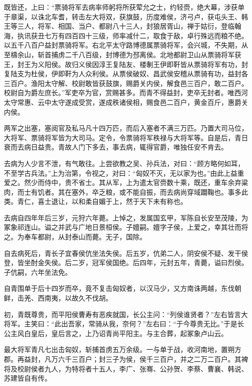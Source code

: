 \documentclass[12pt,UTF8]{ctexbook}
\begin{document}
既皆还，上曰：“票骑将军去病率师躬将所获荤允之士，约轻赍，绝大幕，涉获单于章渠，以诛北车耆，转击左大将双，获旗鼓，历度难侯，济弓卢，获屯头王、韩王等三人，将军、相国、当户、都尉八十三人，封狼居胥山，禅于姑衍，登临翰海，执讯获丑七万有四百四十三级，师率减什二，取食于敌，卓行殊远而粮不绝。以五千八百户益封票骑将军。右北平太守路博德属票骑将军，会兴城，不失期，从至檮余山，斩首捕虏二千八百级，封博德为邳离侯。北地都尉卫山从票骑将军获王，封王为义阳侯。故归义侯因淳王复陆友、楼剸王伊即靬皆从票骑将军有功，封复陆支为杜侯，伊即靬为人众利侯。从票侯破奴、昌武侯安稽从票骑有功，益封各三百户。渔阳太守解、校尉敢皆获鼓旗，赐爵关内侯，解食邑三百户，敢二百户。校尉自为爵左庶长。”军吏卒为官，赏赐甚多。而青不得益封，吏卒无封者。唯西河太守常惠、云中太守遂成受赏，遂成秩诸侯相，赐食邑二百户，黄金百斤，惠爵关内侯。



两军之出塞，塞阅官及私马凡十四万匹，而后入塞者不满三万匹。乃置大司马位，大将军、票骑将军皆为大司马。定令，令票骑将军秩禄与大将军等。自是后，青日衰而去病日益贵。青故人门下多去，事去病，辄得官爵，唯独任安不肯去。



去病为人少言不泄，有气敢往。上尝欲教之吴、孙兵法，对曰：“顾方略何如耳，不至学古兵法。”上为治第，令视之，对曰：“匈奴不灭，无以家为也。”由此上益重爱之。然少而侍中，贵不省士。其从军，上为遣太官赍数十乘，既还，重车余弃粱肉，而士有饥者。其在塞外，卒乏粮，或不能自振，而去病尚穿域躢鞠也。事多此类。青仁，喜士退让，以和柔自媚于上，然于天下未有称也。



去病自四年年后三岁，元狩六年薨。上悼之，发属国玄甲，军陈自长安至茂陵，为冢象祁连山。谥之并武与广地日景桓侯。子嬗嗣。嬗字子侯，上爱之，幸其壮而将之。为奉车都尉，从封泰山而薨。无子，国除。



自去病死后，青长子宜春侯伉坐法失侯。后五岁，伉弟二人，阴安侯不疑、发干侯登，皆坐酎金失侯。后二岁，冠军侯国绝。后四年，元封五年，青薨，谥曰烈侯。子伉嗣，六年坐法免。



自青围单于后十四岁而卒，竟不复击匈奴者，以汉马少，又方南诛两越，东伐朝鲜，击羌、西南夷，以故久不伐胡。



初，青既尊贵，而平阳侯曹寿有恶疾就国，长公主问：“列侯谁贤者？”左右皆言大将军。主笑曰：“此出吾家，常骑从我，奈何？”左右曰：“于今尊贵无比。”于是长公主风白皇后，皇后言之，上乃诏青尚平阳主。与主合葬，起冢象卢山云。



最大将军青凡七出击匈奴，斩捕首虏五万余级。一与单于战，收河南地，置朔方郡。再益封，凡万六千三百户；封三子为侯，侯千三百户，并之二万二百户。其裨将及校尉侯者九人，为特将者十五人，李广、张骞、公孙贺、李蔡、曹襄、韩说、苏建皆自有传。
\end{document}
